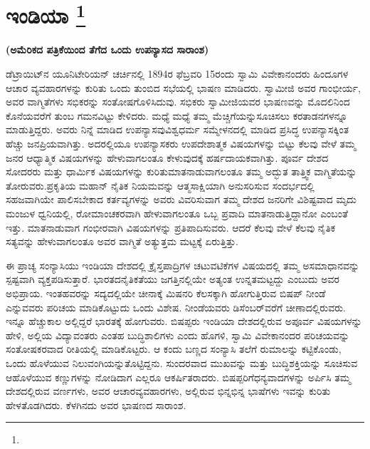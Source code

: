 
\vspace{-1cm}

\chapter[ಇಂಡಿಯಾ ]{ಇಂಡಿಯಾ \protect\footnote{}}

\centerline{\textbf{(ಅಮೆರಿಕದ ಪತ್ರಿಕೆಯಿಂದ ತೆಗೆದ ಒಂದು ಉಪನ್ಯಾಸದ ಸಾರಾಂಶ)}}

ಡೆಟ್ರಾಯಿಟ್​ನ ಯೂನಿಟೇರಿಯನ್​ ಚರ್ಚಿನಲ್ಲಿ 1894ರ ಫೆಬ್ರವರಿ 15ರಂದು ಸ್ವಾಮಿ ವಿವೇಕಾನಂದರು ಹಿಂದೂಗಳ ಆಚಾರ ವ್ಯವಹಾರಗಳನ್ನು ಕುರಿತು ಒಂದು ತುಂಬಿದ ಸಭೆಯಲ್ಲಿ ಭಾಷಣ ಮಾಡಿದರು. ಸ್ವಾಮೀಜಿ ಅವರ ಗಾಂಭೀರ್ಯ, ಅವರ ವಾಗ್ಮಿತೆಗಳು ಸಭಿಕರನ್ನು ಸಂತೋಷಗೊಳಿಸಿದುವು. ಸಭಿಕರು ಸ್ವಾಮೀಜಿಯವರ ಭಾಷಣವನ್ನು ಮೊದಲಿನಿಂದ ಕೊನೆಯವರೆಗೆ ತುಂಬ ಗಮನವಿಟ್ಟು ಕೇಳಿದರು. ಮಧ್ಯೆ ಮಧ್ಯೆ ತಮ್ಮ ಮೆಚ್ಚಿಗೆಯನ್ನು\break ಸೂಚಿಸಲು ಕರತಾಡನಗಳನ್ನೂ ಮಾಡುತ್ತಿದ್ದರು. ಅವರು ನಿನ್ನೆ ಮಾಡಿದ ಉಪನ್ಯಾಸವು\break ವಿಶ್ವಧರ್ಮ ಸಮ್ಮೇಳನದಲ್ಲಿ ಮಾಡಿದ ಪ್ರಸಿದ್ಧ ಉಪನ್ಯಾಸಕ್ಕಿಂತ ಹೆಚ್ಚು ಜನಪ್ರಿಯವಾಗಿತ್ತು. ಅದರಲ್ಲಿಯೂ ಉಪನ್ಯಾಸಕರು ಉಪದೇಶಾತ್ಮಕ ವಿಷಯಗಳನ್ನು ಬಿಟ್ಟು ಕೆಲವು ವೇಳೆ ತಮ್ಮ ಜನರ ಆಧ್ಯಾತ್ಮಿಕ ವಿಷಯಗಳನ್ನು ಹೇಳುವಾಗಲಂತೂ ಕೇಳುವುದಕ್ಕೆ ಹರ್ಷದಾಯಕ\break ವಾಗಿತ್ತು. ಪೂರ್ವ ದೇಶದ ಸೋದರರು ಮತ್ತು ಧಾರ್ಮಿಕ ವಿಷಯಗಳನ್ನು ಕುರಿತು\break ಮಾತನಾಡುವಾಗಲಂತೂ ತಮ್ಮ ಅದ್ಭುತ ತಾತ್ತ್ವಿಕ ವಾಗ್ಮಿತೆಯನ್ನು ತೋರುವರು.\break ಪ್ರಕೃತಿಯ ಮಹಾನ್​ ನೈತಿಕ ನಿಯಮವನ್ನು ಆತ್ಮಸಾಕ್ಷಿಯಾಗಿ ಅನುಸರಿಸುವ ಸಂದರ್ಭದಲ್ಲಿ ಸಹಜವಾಗಿಯೇ ಪಾಲಿಸಬೇಕಾದ ಕರ್ತವ್ಯಗಳನ್ನು ಅವರು ವಿವರಿಸುವಾಗ ತಮ್ಮ ದೇಶದ ಜನರಿಗೇ ವಿಶಿಷ್ಟವಾದ ಮೃದು ಮಂಜುಳ ಧ್ವನಿಯಲ್ಲಿ, ರೋಮಾಂಚಕರವಾಗಿ ಹೇಳುವಾಗಲಂತೂ ಒಬ್ಬ ಪ್ರವಾದಿ ಮಾತನಾಡುತ್ತಿದ್ದಾನೋ ಎಂಬಂತೆ ಇತ್ತು. ಮಾತನಾಡುವಾಗ ಗಂಭೀರವಾಗಿ ವಿಷಯಗಳನ್ನು ಪ್ರತಿಪಾದಿಸುವರು. ಆದರೆ ಕೆಲವು ವೇಳೆ ಕೆಲವು ನೈತಿಕ ಸತ್ಯವನ್ನು ಹೇಳುವಾಗಲಂತೂ ಅವರ ವಾಗ್ಮಿತೆ ಅತ್ಯುತ್ತಮ ಮಟ್ಟಕ್ಕೆ ಏರುತ್ತಿತ್ತು.

ಈ ಪ್ರಾಚ್ಯ ಸಂನ್ಯಾಸಿಯು ಇಂಡಿಯಾ ದೇಶದಲ್ಲಿ ಕ್ರೈಸ್ತಪಾದ್ರಿಗಳ ಚಟುವಟಿಕೆಗಳ ವಿಷಯದಲ್ಲಿ ತಮ್ಮ ಅಸಮಾಧಾನವನ್ನು ಸ್ಪಷ್ಟವಾಗಿ ವ್ಯಕ್ತಪಡಿಸುತ್ತಾರೆ. ಭಾರತದ\break ನೈತಿಕತೆಯು ಜಗತ್ತಿನಲ್ಲಿಯೇ ಅತ್ಯಂತ ಉನ್ನತಮಟ್ಟದ್ದು ಎಂಬುದು ಅವರ ಅಭಿಪ್ರಾಯ. ಇಂತಹವರನ್ನು ಸದ್ಯದಲ್ಲಿಯೇ ಚೀನಾಕ್ಕೆ ಮಿಷನರಿ ಕೆಲಸಕ್ಕಾಗಿ ಹೋಗುತ್ತಿರುವ ಬಿಷಪ್​ ನೀಂಡೆ ಎನ್ನುವವರು ಪರಿಚಯ ಮಾಡಿಕೊಟ್ಟುದು ಒಂದು ವಿಶೇಷ. ನೀಂಡೆಯವರು ಡಿಸೆಂಬರ್​ವರೆಗೆ ಚೀಣಾದಲ್ಲಿರುವರು. ಇನ್ನೂ ಹೆಚ್ಚುಕಾಲ ಅಲ್ಲಿದ್ದರೆ ಭಾರತಕ್ಕೆ ಹೋಗುವರು. ಬಿಷಪ್ಪರು ಇಂಡಿಯಾ ದೇಶದಲ್ಲಿರುವ ಅಪೂರ್ವ ವಿಷಯಗಳನ್ನು ಹೇಳಿ, ಅಲ್ಲಿಯ ವಿದ್ಯಾವಂತರು ಎಂತಹ ಬುದ್ಧಿಶಾಲಿಗಳು ಎಂದು ಹೊಗಳಿ, ಸ್ವಾಮಿ ವಿವೇಕಾನಂದರ ಪರಿಚಯವನ್ನು ಸಂತೋಷಕರವಾದ ರೀತಿಯಲ್ಲಿ ಮಾಡಿಕೊಟ್ಟರು. ಆ ಕಂದು ಬಣ್ಣದ ಸಂನ್ಯಾಸಿ ತಲೆಗೆ ರುಮಾಲನ್ನು ಕಟ್ಟಿಕೊಂಡು, ಒಂದು ಹೊಳೆಯುವ ನಿಲುವಂಗಿಯನ್ನು\break ತೊಟ್ಟಿದ್ದನು. ಸುಂದರವಾದ ಮುಖವನ್ನು ಮತ್ತು ಬುದ್ಧಿಶಕ್ತಿಯನ್ನು ಸೂಚಿಸುವ ಆ\break ಹೊಳೆಯುವ ಕಣ್ಣುಗಳನ್ನು ನೋಡಿದಾಗ ಎಲ್ಲರೂ ಆಕರ್ಷಿತರಾದರು. ಬಿಷಪ್ಪರಿಗೆ\break ಧನ್ಯವಾದಗಳನ್ನು ಅರ್ಪಿಸಿ ತಮ್ಮ ದೇಶದಲ್ಲಿರುವ ವರ್ಣಗಳು, ಅವರ ಆಚಾರ\break ವ್ಯವಹಾರಗಳು, ಅಲ್ಲಿರುವ ಭಿನ್ನಭಿನ್ನ ಭಾಷೆಗಳು ಇವನ್ನು ಕುರಿತು ಹೇಳತೊಡಗಿದರು. ಕೆಳಗಿನದು ಅವರ ಭಾಷಣದ ಸಾರಾಂಶ.

